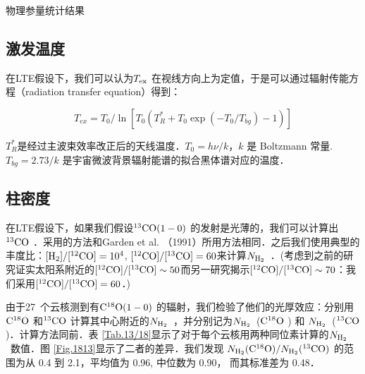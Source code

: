 \documentclass[UTF8, nocolorlinks]{pkuthss}
\newcommand{\cob}{$\rm ^{13}CO$ }
\newcommand{\coc}{$\rm C^{18}O$ }
\newcommand{\cobb}{$\rm^{13}CO(1-0)$ }
\newcommand{\cocc}{$\rm C^{18}O(1-0)$ }
\newcommand{\texc}{$T_{\rm {ex}}$ }
\newcommand{\nhyd}{$N_{\rm H_2}$\ }
\newcommand{\numcompofcores}{27\ }
\begin{document}
		\begin{table}
			\begin{footnotesize}
	        \begin{center}
	        \caption{物理参量统计结果\label{Tab.PhysicalParaStat}}

	        \setlength{\tabcolsep}{0.04in}
	        \vspace{0.5em}

	        

	        \end{center}
	        \end{footnotesize}
        \end{table}

        \subsection{激发温度}

	        在LTE假设下，我们可以认为\texc 在视线方向上为定值，于是可以通过辐射传能方程（radiation transfer equation）得到：

		    \begin{equation}
		    	T_{ex} = T_0 / \ln[T_0 (T^*_R + T_0 \exp{(-T_0/T_{bg})}-1)]
		    \end{equation}

		    $T^*_R$是经过主波束效率改正后的天线温度．$T_0 = h\nu /k$，$k$ 是 Boltzmann 常量. $T_{bg} = 2.73 /k$ 是宇宙微波背景辐射能谱的拟合黑体谱对应的温度．

		\subsection{柱密度}\label{Sec.ColumnDensity}

			在LTE假设下，如果我们假设\cobb 的发射是光薄的，我们可以计算出\cob ．采用的方法和Garden et al. （1991）所用方法相同\supercite{1991ApJ...374..540G}．之后我们使用典型的丰度比：$\rm [H_2]/[ ^{12}CO]=10^4$,  $\rm [^{12}CO]/[^{13}CO]=60$来计算\nhyd．(考虑到之前的研究\supercite{1987ApJ...317..926H}证实太阳系附近的$\rm [^{12}CO]/[^{13}CO]\sim 50$而另一研究\supercite{1980Sci...208..663P}揭示$\rm [^{12}CO]/[^{13}CO]\sim 70$：我们采用$\rm [^{12}CO]/[^{13}CO]=60$．)

			由于\numcompofcores 个云核测到有\cocc 的辐射，我们检验了他们的光厚效应：分别用\coc 和\cob 计算其中心附近的\nhyd，并分别记为\nhyd(\coc) 和 \nhyd(\cob)．计算方法同前\supercite{1991ApJ...374..540G}．表 \ref{Tab.13/18}显示了对于每个云核用两种同位素计算的\nhyd 数值．图 \ref{Fig.1813}显示了二者的差异．我们发现 ${N_{\rm H_2}(\rm C^{18}O)}/{ N_{\rm H_2}(\rm ^{13}CO)}$ 的范围为从 0.4 到 2.1，平均值为 0.96, 中位数为 0.90， 而其标准差为 0.48．
\end{document}

